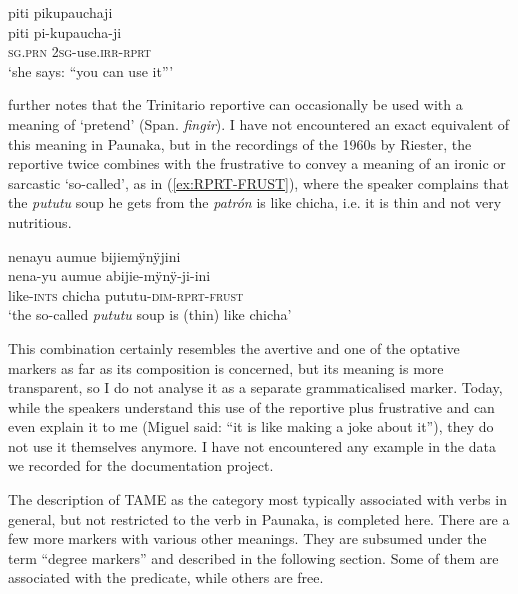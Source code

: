 \ea\label{ex:RPRT-CORR}
\begingl 
\glpreamble piti pikupauchaji\\
\gla piti pi-kupaucha-ji\\ 
\textsc{sg.prn} 2\textsc{sg}-use.\textsc{irr}-\textsc{rprt}\\ 
\glft ‘she says: “you can use it”’\\ 
\endgl
{}
\xe

\citet[83]{Rose2014a} further notes that the Trinitario reportive can occasionally be used with a meaning of ‘pretend’ (Span. \textit{fingir}). I have not encountered an exact equivalent of this meaning in Paunaka, but in the recordings of the 1960s by Riester, the reportive twice combines with the frustrative to convey a meaning of an ironic or sarcastic ‘so-called’, as in (\ref{ex:RPRT-FRUST}), where the speaker complains that the \textit{pututu} soup he gets from the \textit{patrón} is like chicha, i.e. it is thin and not very nutritious.

\ea\label{ex:RPRT-FRUST}
\begingl 
\glpreamble nenayu aumue bijiemÿnÿjini\\
\gla nena-yu aumue abijie-mÿnÿ-ji-ini\\ 
\glb like-\textsc{ints} chicha pututu-\textsc{dim}-\textsc{rprt}-\textsc{frust}\\ 
\glft ‘the so-called \textit{pututu} soup is (thin) like chicha’\\ 
\endgl
\trailingcitation{[nxx-p630101g-2.58]}
\xe

This combination certainly resembles the avertive and one of the optative markers as far as its composition is concerned, but its meaning is more transparent, so I do not analyse it as a separate grammaticalised marker. Today, while the speakers understand this use of the reportive plus frustrative and can even explain it to me (Miguel said: “it is like making a joke about it”), they do not use it themselves anymore. I have not encountered any example in the data we recorded for the documentation project.  

The description of TAME as the category most typically associated with verbs in general, but not restricted to the verb in Paunaka, is completed here. There are a few more markers with various other meanings. They are subsumed under the term “degree markers” and described in the following section. Some of them are associated with the predicate, while others are free.


